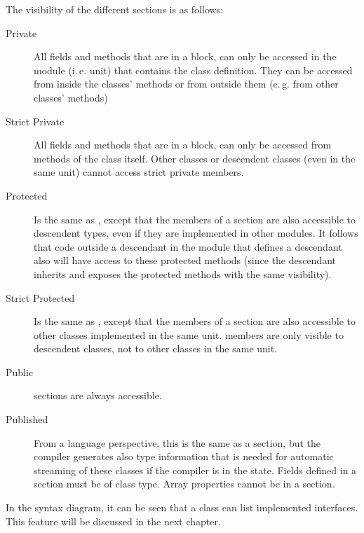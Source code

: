 The visibility of the different sections is as follows:
\begin{description}
\item [Private\ ]  All fields and methods that are in a  block, can
only be accessed in the module (i.\,e. unit) that contains the class definition.
They can be accessed from inside the classes' methods or from outside them
(e.\,g. from other classes' methods)
\item [Strict Private\ ]  All fields and methods that are in a
 block, can only be accessed from methods of the class
itself. Other classes or descendent classes (even in the same unit) cannot
access strict private members.  
\item [Protected\ ] %
Is the same as , except that the members of
a  section are also accessible to descendent types, even if
they are implemented in other modules. It follows that code outside a
descendant in the module that defines a descendant also will have access to
these protected methods (since the descendant inherits and exposes the protected
methods with the same visibility). 
\item [Strict Protected\ ] %
Is the same as , except that the members of
a  section are also accessible to other classes implemented in the
same unit.  members are only visible to descendent
classes, not to other classes in the same unit. 
\item [Public\ ]  sections are always
accessible.
\item [Published\ ]  From a
language perspective, this is the same as a  section, but the compiler generates also type
information that is needed for automatic streaming of these classes if the compiler is in the
 state. Fields defined in a  section must be of class type.
Array properties cannot be in a  section.
\end{description}
In the syntax diagram, it can be seen that a class can list implemented
interfaces. This feature will be discussed in the next chapter.

